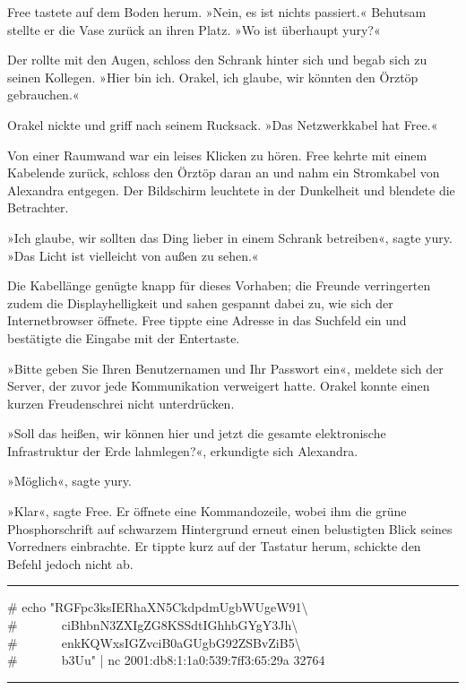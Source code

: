 Free tastete auf dem Boden herum. »Nein, es ist nichts passiert.« Behutsam stellte er die Vase zurück an ihren Platz. »Wo ist überhaupt yury?«

Der rollte mit den Augen, schloss den Schrank hinter sich und begab sich zu seinen Kollegen. »Hier bin ich. Orakel, ich glaube, wir könnten den Örztöp gebrauchen.«

Orakel nickte und griff nach seinem Rucksack. »Das Netzwerkkabel hat Free.«

Von einer Raumwand war ein leises Klicken zu hören. Free kehrte mit einem Kabelende zurück, schloss den Örztöp daran an und nahm ein Stromkabel von Alexandra entgegen. Der Bildschirm leuchtete in der Dunkelheit und blendete die Betrachter.

»Ich glaube, wir sollten das Ding lieber in einem Schrank betreiben«, sagte yury. »Das Licht ist vielleicht von außen zu sehen.«

Die Kabellänge genügte knapp für dieses Vorhaben; die Freunde verringerten zudem die Displayhelligkeit und sahen gespannt dabei zu, wie sich der Internetbrowser öffnete. Free tippte eine Adresse in das Suchfeld ein und bestätigte die Eingabe mit der Entertaste.

»Bitte geben Sie Ihren Benutzernamen und Ihr Passwort ein«, meldete sich der Server, der zuvor jede Kommunikation verweigert hatte. Orakel konnte einen kurzen Freudenschrei nicht unterdrücken.

»Soll das heißen, wir können hier und jetzt die gesamte elektronische Infrastruktur der Erde lahmlegen?«, erkundigte sich Alexandra.

»Möglich«, sagte yury.

»Klar«, sagte Free. Er öffnete eine Kommandozeile, wobei ihm die grüne Phosphorschrift auf schwarzem Hintergrund erneut einen belustigten Blick seines Vorredners einbrachte. Er tippte kurz auf der Tastatur herum, schickte den Befehl jedoch nicht ab.

\noindent \parbox{\textwidth}{ \vspace{3ex} \hrule \vspace{3ex}

    \begin{footnotesize}
    \begin{ttfamily}

\noindent \# echo "RGFpc3ksIERhaXN5CkdpdmUgbWUgeW91\textbackslash\\
\noindent \#~~~~~~~ciBhbnN3ZXIgZG8KSSdtIGhhbGYgY3Jh\textbackslash\\
\noindent \#~~~~~~~enkKQWxsIGZvciB0aGUgbG92ZSBvZiB5\textbackslash\\
\noindent \#~~~~~~~b3Uu" | nc 2001:db8:1:1a0:539:7ff3:65:29a 32764

    \end{ttfamily}
    \end{footnotesize}

\vspace{3ex} \hrule \vspace{3ex} }

